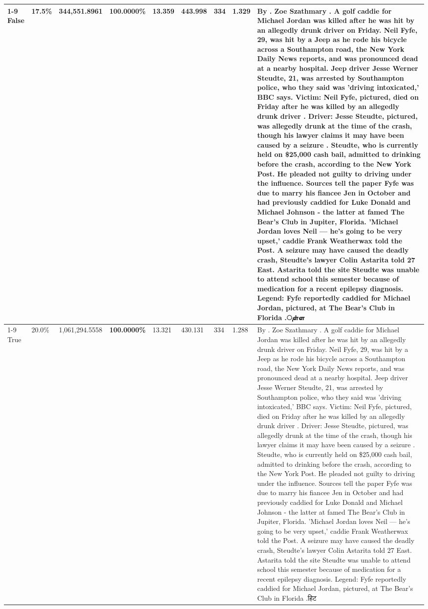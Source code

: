 \begin{table}[H]
\begin{tabular}{lllrlllll}
\cline{1-9}
False & 17.5\% & 344,551.8961 & \bfseries \color{red} 100.0000\% & 13.359 & 443.998 & 334 & 1.329 & By . Zoe Szathmary . A golf caddie for Michael Jordan was killed after he was hit by an allegedly drunk driver on Friday. Neil Fyfe, 29, was hit by a Jeep as he rode his bicycle across a Southampton road, the New York Daily News reports, and was pronounced dead at a nearby hospital. Jeep driver Jesse Werner Steudte, 21, was arrested by Southampton police, who they said was 'driving intoxicated,' BBC says. Victim: Neil Fyfe, pictured, died on Friday after he was killed by an allegedly drunk driver . Driver: Jesse Steudte, pictured, was allegedly drunk at the time of the crash, though his lawyer claims it may have been caused by a seizure . Steudte, who is currently held on \$25,000 cash bail, admitted to drinking before the crash, according to the New York Post. He pleaded not guilty to driving under the influence. Sources tell the paper Fyfe was due to marry his fiancee Jen in October and had previously caddied for Luke Donald and Michael Johnson - the latter at famed The Bear's Club in Jupiter, Florida. 'Michael Jordan loves Neil — he’s going to be very upset,' caddie Frank Weatherwax told the Post. A seizure may have caused the deadly crash, Steudte's lawyer Colin Astarita told 27 East. Astarita told the site Steudte was unable to attend school this semester because of medication for a recent epilepsy diagnosis. Legend: Fyfe reportedly caddied for Michael Jordan, pictured, at The Bear's Club in Florida .ுள்ள \\
\cline{1-9}
True & 20.0\% & 1,061,294.5558 & \bfseries \color{red} 100.0000\% & 13.321 & 430.131 & 334 & 1.288 & By . Zoe Szathmary . A golf caddie for Michael Jordan was killed after he was hit by an allegedly drunk driver on Friday. Neil Fyfe, 29, was hit by a Jeep as he rode his bicycle across a Southampton road, the New York Daily News reports, and was pronounced dead at a nearby hospital. Jeep driver Jesse Werner Steudte, 21, was arrested by Southampton police, who they said was 'driving intoxicated,' BBC says. Victim: Neil Fyfe, pictured, died on Friday after he was killed by an allegedly drunk driver . Driver: Jesse Steudte, pictured, was allegedly drunk at the time of the crash, though his lawyer claims it may have been caused by a seizure . Steudte, who is currently held on \$25,000 cash bail, admitted to drinking before the crash, according to the New York Post. He pleaded not guilty to driving under the influence. Sources tell the paper Fyfe was due to marry his fiancee Jen in October and had previously caddied for Luke Donald and Michael Johnson - the latter at famed The Bear's Club in Jupiter, Florida. 'Michael Jordan loves Neil — he’s going to be very upset,' caddie Frank Weatherwax told the Post. A seizure may have caused the deadly crash, Steudte's lawyer Colin Astarita told 27 East. Astarita told the site Steudte was unable to attend school this semester because of medication for a recent epilepsy diagnosis. Legend: Fyfe reportedly caddied for Michael Jordan, pictured, at The Bear's Club in Florida .हिट \\

\end{tabular}
\end{table}

